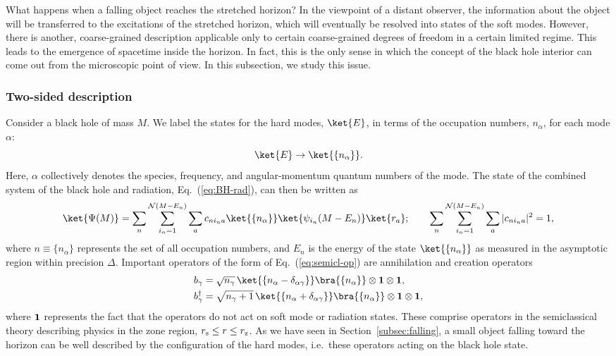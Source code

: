 \documentclass[12pt]{article}
\begin{document}
What happens when a falling object reaches the stretched horizon? 
In the viewpoint of a distant observer, the information about the 
object will be transferred to the excitations of the stretched 
horizon, which will eventually be resolved into states of the 
soft modes.  However, there is another, coarse-grained description 
applicable only to certain coarse-grained degrees of freedom in 
a certain limited regime.  This leads to the emergence of spacetime 
inside the horizon.  In fact, this is the only sense in which the 
concept of the black hole interior can come out from the microscopic 
point of view.  In this subsection, we study this issue.

\subsubsection{Two-sided description}
\label{subsubsec:two-sided}

Consider a black hole of mass $M$.  We label the states for 
the hard modes, $\ket{E}$, in terms of the occupation numbers, 
$n_\alpha$, for each mode $\alpha$:
%
\begin{equation}
  \ket{E} \rightarrow \ket{\{ n_\alpha \}}.
\label{eq:n_xi}
\end{equation}
%
Here, $\alpha$ collectively denotes the species, frequency, 
and angular-momentum quantum numbers of the mode.  The state 
of the combined system of the black hole and radiation, 
Eq.~(\ref{eq:BH-rad}), can then be written as
%
\begin{equation}
  \ket{\Psi(M)} = \sum_n \sum_{i_n = 1}^{{\cal N}(M-E_n)} 
    \sum_a c_{n i_n a} \ket{\{ n_\alpha \}} 
    \ket{\psi_{i_n}(M-E_n)} \ket{r_a};
\qquad
  \sum_n \sum_{i_n = 1}^{{\cal N}(M-E_n)} \sum_a |c_{n i_n a}|^2 = 1,
\label{eq:BH-occup}
\end{equation}
%
where $n \equiv \{ n_\alpha \}$ represents the set of all 
occupation numbers, and $E_n$ is the energy of the state 
$\ket{\{ n_\alpha \}}$ as measured in the asymptotic region 
within precision $\Delta$.  Important operators of the form of 
Eq.~(\ref{eq:semicl-op}) are annihilation and creation operators
%
\begin{align}
  b_\gamma &= \sqrt{n_\gamma}\, 
    \ket{\{ n_\alpha - \delta_{\alpha\gamma} \}} \bra{\{ n_\alpha \}} 
    \otimes {\bf 1} \otimes {\bf 1},
\label{eq:ann}\\
  b_\gamma^\dagger &= \sqrt{n_\gamma + 1}\, 
    \ket{\{ n_\alpha + \delta_{\alpha\gamma} \}} \bra{\{ n_\alpha \}} 
    \otimes {\bf 1} \otimes {\bf 1},
\label{eq:cre}
\end{align}
%
where ${\bf 1}$ represents the fact that the operators do not act 
on soft mode or radiation states.  These comprise operators in 
the semiclassical theory describing physics in the zone region, 
$r_{\rm s} \leq r \leq r_{\rm z}$.  As we have seen in 
Section~\ref{subsec:falling}, a small object falling toward 
the horizon can be well described by the configuration of the 
hard modes, i.e.\ these operators acting on the black hole state.
\end{document}
